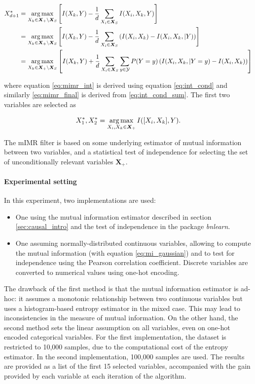 \begin{align}
    X_{d+1}^* &= \operatorname*{arg\,max}_{X_k\in\bm X_+ \setminus \bm X_S}
    \left[I(X_k,Y) - \frac{1}{d}\sum_{X_i\in\bm X_S} I(X_i, X_k, Y)\right]\\
    &= \operatorname*{arg\,max}_{X_k\in\bm X_+ \setminus \bm X_S}
    \left[I(X_k,Y) - \frac{1}{d}\sum_{X_i\in\bm X_S}
    \left(I(X_i,X_k)-I(X_i, X_k,|Y)\right)\right]\label{eq:mimr_int}\\
    &= \operatorname*{arg\,max}_{X_k\in\bm X_+ \setminus \bm X_S}
    \left[I(X_k,Y) + \frac{1}{d}\sum_{X_i\in\bm X_S} \sum_{y\in\mathcal Y}
    P(Y = y)\left(I(X_i, X_k,|Y=y)-I(X_i,X_k)\right)\right]\label{eq:mimr_final}
\end{align}

where equation \ref{eq:mimr_int} is derived using equation \ref{eq:int_cond} and
similarly \ref{eq:mimr_final} is derived from \ref{eq:int_cond_sum}. The first two variables are selected as

\begin{equation}
    X_1^*, X_2^* = \operatorname*{arg\,max}_{X_i, X_k\in\bm X_+}I([X_i,X_k],Y).
\end{equation}

The mIMR filter is based on some underlying estimator of mutual information
between two variables, and a statistical test of independence for selecting the
set of unconditionally relevant variables $\bm X_+$.

\paragraph{Experimental setting} In this experiment, two implementations are
used:
\noprelistbreak
\begin{itemize}
    \item One using the mutual information estimator described in section
    \ref{sec:causal_intro} and the test of independence in the package
    \emph{bnlearn}.
    \item One assuming normally-distributed continuous variables, allowing to
    compute the mutual information (with equation \ref{eq:mi_gaussian}) and to
    test for independence using the Pearson correlation coefficient. Discrete
    variables are converted to numerical values using one-hot encoding.
\end{itemize}

The drawback of the first method is that the mutual information estimator is
ad-hoc: it assumes a monotonic relationship between two continuous variables
but uses a histogram-based entropy estimator in the mixed case. This may lead to
inconsistencies in the measure of mutual information. On the other hand, the
second method sets the linear assumption on all variables, even on one-hot
encoded categorical variables. For the first implementation, the dataset is
restricted to 10,000 samples, due to the computational cost of the entropy
estimator. In the second implementation, 100,000 samples are used. The results
are provided as a list of the first 15 selected variables, accompanied with the
gain provided by each variable at each iteration of the algorithm.

